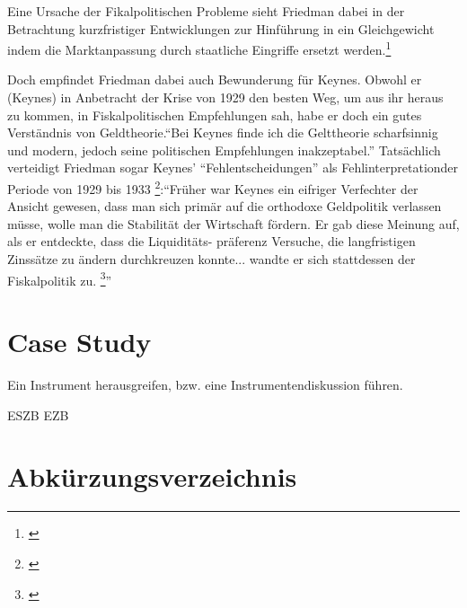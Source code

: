 \documentclass[
        onecolumn,
        a4paper,
        abstracton,
        parskip=half
        ,final
        ]{scrartcl}
\begin{document}
 Eine Ursache der Fikalpolitischen Probleme sieht Friedman dabei in der Betrachtung kurzfristiger Entwicklungen zur Hinf{\"u}hrung in ein Gleichgewicht indem die Marktanpassung durch staatliche Eingriffe ersetzt werden.\footnote[802]{\citep[S.127]{friedman1970die}}

Doch empfindet Friedman dabei auch Bewunderung f{\"u}r Keynes. Obwohl er (Keynes) in Anbetracht der Krise von 1929 den besten Weg,
um aus ihr heraus zu kommen, in Fiskalpolitischen Empfehlungen sah, habe er doch ein gutes
Verst{\"a}ndnis von Geldtheorie."`Bei Keynes finde ich die Gelttheorie scharfsinnig und
modern, jedoch seine politischen Empfehlungen inakzeptabel."' Tats{\"a}chlich verteidigt
Friedman sogar Keynes'  "`Fehlentscheidungen"' als Fehlinterpretationder Periode von 1929
bis 1933 \footnote[803]{\citep[S.121]{friedman1970die}}:"`Fr{\"u}her war Keynes ein eifriger Verfechter der Ansicht gewesen, dass man sich
prim{\"a}r auf die orthodoxe Geldpolitik verlassen m{\"u}sse, wolle man die Stabilit{\"a}t der
Wirtschaft f{\"o}rdern. Er gab diese Meinung auf, als er entdeckte, dass die Liquidit{\"a}ts-
pr{\"a}ferenz Versuche, die langfristigen Zinss{\"a}tze zu {\"a}ndern durchkreuzen konnte... wandte er
sich stattdessen der Fiskalpolitik zu. \footnote[804]{\citep[S.126]{friedman1970die}}"'




\section{Case Study}
\label{sec4:CaseStudy}
Ein Instrument herausgreifen, bzw. eine Instrumentendiskussion f{\"u}hren.




\clearpage
\ac{ESZB}
\ac{EZB}

\clearpage

\section{Abk{\"u}rzungsverzeichnis}
	\label{sec5:Abkuerzungsverzeichnis}

\begin{acronym}[ESZB]



\end{acronym}
\end{document}
